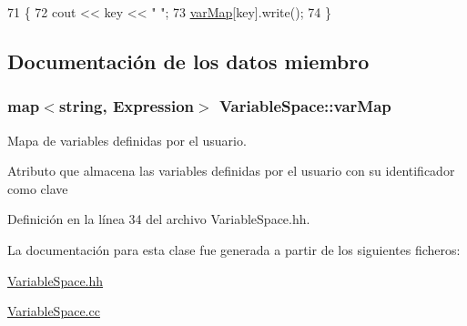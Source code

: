 \begin{DoxyCode}
71 \{
72   cout << key << \textcolor{stringliteral}{" "};
73   \hyperlink{class_variable_space_a5af4ff4cfb476da8de2ffd88e511dd01}{varMap}[key].write();
74 \}
\end{DoxyCode}


\subsection{Documentación de los datos miembro}
\subsubsection[{\texorpdfstring{var\+Map}{varMap}}]{\setlength{\rightskip}{0pt plus 5cm}map$<$string, {\bf Expression}$>$ Variable\+Space\+::var\+Map\hspace{0.3cm}{\ttfamily [private]}}\hypertarget{class_variable_space_a5af4ff4cfb476da8de2ffd88e511dd01}{}\label{class_variable_space_a5af4ff4cfb476da8de2ffd88e511dd01}


Mapa de variables definidas por el usuario. 

Atributo que almacena las variables definidas por el usuario con su identificador como clave 

Definición en la línea 34 del archivo Variable\+Space.\+hh.



La documentación para esta clase fue generada a partir de los siguientes ficheros\+:\begin{DoxyCompactItemize}
\item 
\hyperlink{_variable_space_8hh}{Variable\+Space.\+hh}\item 
\hyperlink{_variable_space_8cc}{Variable\+Space.\+cc}\end{DoxyCompactItemize}
